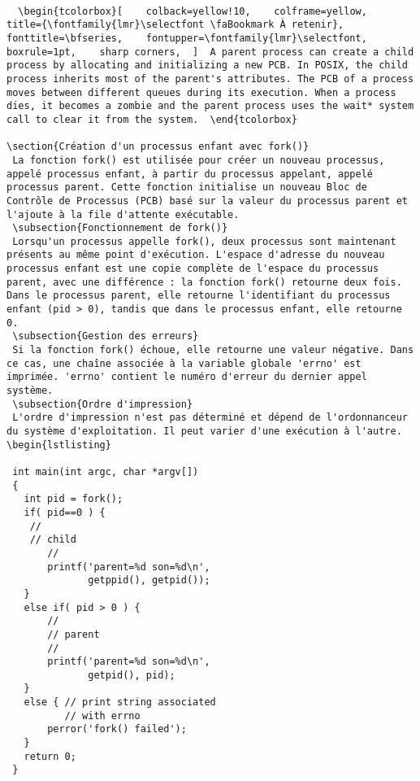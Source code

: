 \documentclass[12pt]{report}
\begin{document}
\begin{lstlisting}

  \begin{tcolorbox}[    colback=yellow!10,    colframe=yellow,    title={\fontfamily{lmr}\selectfont \faBookmark À retenir},    fonttitle=\bfseries,    fontupper=\fontfamily{lmr}\selectfont,    boxrule=1pt,    sharp corners,  ]  A parent process can create a child process by allocating and initializing a new PCB. In POSIX, the child process inherits most of the parent's attributes. The PCB of a process moves between different queues during its execution. When a process dies, it becomes a zombie and the parent process uses the wait* system call to clear it from the system.  \end{tcolorbox}  

\section{Création d'un processus enfant avec fork()} 
 La fonction fork() est utilisée pour créer un nouveau processus, appelé processus enfant, à partir du processus appelant, appelé processus parent. Cette fonction initialise un nouveau Bloc de Contrôle de Processus (PCB) basé sur la valeur du processus parent et l'ajoute à la file d'attente exécutable. 
 \subsection{Fonctionnement de fork()} 
 Lorsqu'un processus appelle fork(), deux processus sont maintenant présents au même point d'exécution. L'espace d'adresse du nouveau processus enfant est une copie complète de l'espace du processus parent, avec une différence : la fonction fork() retourne deux fois. Dans le processus parent, elle retourne l'identifiant du processus enfant (pid > 0), tandis que dans le processus enfant, elle retourne 0. 
 \subsection{Gestion des erreurs} 
 Si la fonction fork() échoue, elle retourne une valeur négative. Dans ce cas, une chaîne associée à la variable globale 'errno' est imprimée. 'errno' contient le numéro d'erreur du dernier appel système. 
 \subsection{Ordre d'impression} 
 L'ordre d'impression n'est pas déterminé et dépend de l'ordonnanceur du système d'exploitation. Il peut varier d'une exécution à l'autre.
\begin{lstlisting}

 int main(int argc, char *argv[]) 
 { 
   int pid = fork(); 
   if( pid==0 ) { 
    // 
    // child 
       // 
       printf('parent=%d son=%d\n', 
              getppid(), getpid()); 
   } 
   else if( pid > 0 ) { 
       // 
       // parent 
       // 
       printf('parent=%d son=%d\n', 
              getpid(), pid); 
   } 
   else { // print string associated 
          // with errno    
       perror('fork() failed');  
   } 
   return 0; 
 } 

\end{lstlisting}
\end{document}
